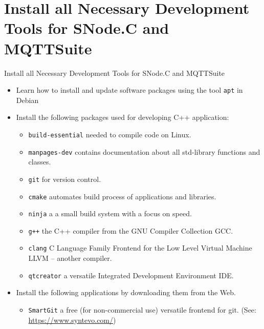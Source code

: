 ﻿\nosectionpage
\section{Install all Necessary Development Tools for SNode.C and MQTTSuite}
\withsectionpage

\begin{frame}{Install all Necessary Development Tools for SNode.C and MQTTSuite}
  \begin{itemize}
    \item Learn how to install and update software packages using the tool \alert{\texttt{apt}} in Debian
    \item Install the following packages used for developing C++ application:
    \begin{itemize}
      \item \alert{\texttt{build-essential}} needed to compile code on Linux.
      \item \alert{\texttt{manpages-dev}} contains documentation about all std-library functions and classes.
      \item \alert{\texttt{git}} for version control.
      \item \alert{\texttt{cmake}} automates build process of applications and libraries.
      \item \alert{\texttt{ninja}} a a small build system with a focus on speed.
      \item \alert{\texttt{g++}} the C++ compiler from the \alert{G}NU \alert{C}ompiler \alert{C}ollection \alert{GCC}.
      \item \alert{\texttt{clang}} \alert{C} \alert{L}anguage \alert{F}amily \alert{F}rontend for the \alert{L}ow \alert{L}evel \alert{V}irtual \alert{M}achine \alert{LLVM} -- another compiler.
      \item \alert{\texttt{qtcreator}} a versatile \alert{I}ntegrated \alert{D}evelopment \alert{E}nvironment \alert{IDE}.
    \end{itemize}
    \item Install the following applications by downloading them from the Web.
    \begin{itemize}
      \item \alert{\texttt{SmartGit}} a free (for non-commercial use) versatile frontend for git. (See: \alert{\href{https://www.syntevo.com/}{https://www.syntevo.com/}})
    \end{itemize}
  \end{itemize}
\end{frame}
